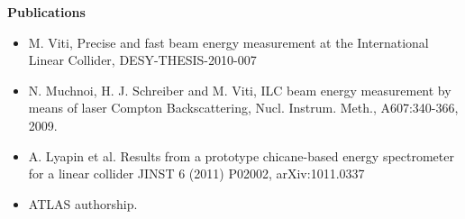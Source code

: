 \documentclass[a4paper,11pt]{article}
\begin{document}
{\bfseries Publications}
\begin{itemize} 
\item M. Viti, Precise and fast beam energy measurement at the
  International Linear Collider, DESY-THESIS-2010-007
\item N. Muchnoi, H. J. Schreiber and M. Viti, ILC beam energy
  measurement by means of laser Compton Backscattering,
  Nucl. Instrum. Meth., A607:340-366, 2009.
\item A. Lyapin et al. Results from a prototype chicane-based energy
  spectrometer for a linear collider JINST 6 (2011) P02002,
  arXiv:1011.0337
\item ATLAS authorship.
\end{itemize}
\end{document}
